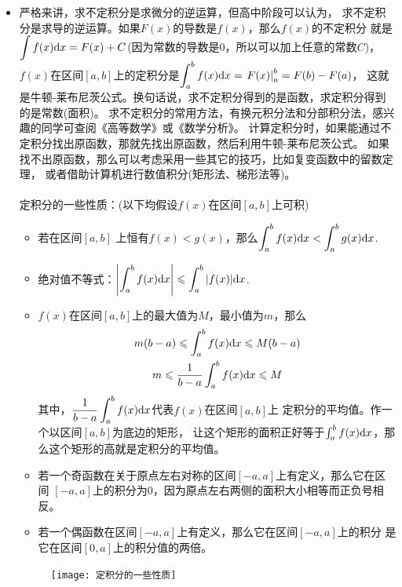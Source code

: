 \begin{itemize}[leftmargin=\inteval{\myitemleftmargin}pt,itemsep=
   \inteval{\myitemitempsep}pt,topsep=\inteval{\myitemtopsep}pt]
以上对求面积的不同方法的精度的讨论，均是在划分的小区间总数有限的情况下进行的。
在用计算机做定积分的时候(计算机只能对有限个数求和，不可能对无穷多个小矩形的面积求和)，
确实要考虑选择何种方法。从理论上可以严格证明，当小区间总数无限多，
而每个小区间都无限窄的时候，无论哪种方法，算出来的面积都是一样的。

\item 严格来讲，求不定积分是求微分的逆运算，但高中阶段可以认为，
求不定积分是求导的逆运算。如果$ F(x) $的导数是$ f(x) $，那么$ f(x) $的不定积分
就是$ \displaystyle\int f(x)\mathrm{d} x=F(x)+C $(因为常数的导数是0，所以可以加上任意的常数$ C $)，
$ f(x) $在区间$ [a,b] $上的定积分是$ \displaystyle \int_a^b f(x)\mathrm{d} x=\left.F(x)
\right|_a^b=F(b)-F(a) $，
这就是牛顿-莱布尼茨公式。换句话说，求不定积分得到的是函数，求定积分得到的是常数(面积)。
求不定积分的常用方法，有换元积分法和分部积分法，感兴趣的同学可查阅《高等数学》或《数学分析》。
计算定积分时，如果能通过不定积分找出原函数，那就先找出原函数，然后利用牛顿-莱布尼茨公式。
如果找不出原函数，那么可以考虑采用一些其它的技巧，比如复变函数中的留数定理，
或者借助计算机进行数值积分(矩形法、梯形法等)。\\
\\ %
定积分的一些性质：(以下均假设$ f(x) $在区间$ [a,b] $上可积)
\begin{itemize}[itemsep=-1pt]
\item 若在区间$ [a,b] $ 上恒有$ f(x)<g(x)$，那么$ \displaystyle \int_a^b f(x)\mathrm{d} x<
\int_a^b g(x)\mathrm{d} x $. 
\item 绝对值不等式：$ \displaystyle \left|\int_a^b f(x)\mathrm{d} x\right|\leqslant\int_a^b |f(x)|\mathrm{d} x $.
\item $ f(x) $在区间$ [a,b] $上的最大值为$ M $，最小值为$ m $，那么
\begin{gather*}
    m(b-a)\leqslant \int_a^b f(x)\mathrm{d} x \leqslant M(b-a) \\
    m \leqslant \dfrac{1}{b-a}\int_a^b f(x)\mathrm{d} x \leqslant M
\end{gather*}
其中，$ \displaystyle \dfrac{1}{b-a}\int_a^b f(x)\mathrm{d} x $代表$ f(x) $在区间$ [a,b] $上
定积分的平均值。作一个以区间$ [a,b] $为底边的矩形，
让这个矩形的面积正好等于$ \int_a^b f(x)\mathrm{d} x $，那么这个矩形的高就是定积分的平均值。
\item 若一个奇函数在关于原点左右对称的区间$ [-a,a] $上有定义，那么它在区间
$ [-a,a] $上的积分为0，因为原点左右两侧的面积大小相等而正负号相反。
\item 若一个偶函数在区间$ [-a,a] $上有定义，那么它在区间$ [-a,a] $上的积分
是它在区间$ [0,a] $上的积分值的两倍。
\end{itemize}
\begin{figure}[h]
    \centering
    \texttt{[image: 定积分的一些性质]}
\end{figure}  


\end{itemize}

